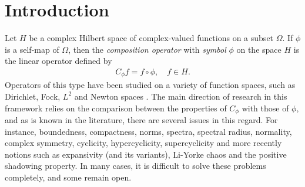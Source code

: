 \documentclass[11pt]{amsart}%
\numberwithin{equation}{section}
\theoremstyle{plain}
\theoremstyle{definition}
\theoremstyle{definition}
\begin{document}
\section{Introduction}
Let $H$ be a complex Hilbert space of complex-valued functions on a subset $\Omega.$  If $\phi$ is a self-map of $\Omega$, then the \textit{composition operator} with \textit{symbol} $\phi$ on the space $H$ is the linear operator defined by
\begin{align*}
C_{\phi}f=f\circ \phi,\quad f\in H.
\end{align*}
Operators of this type have been studied on a variety of function spaces, such as Dirichlet, Fock, $L^2$ and Newton spaces \cite{Bernardes-Darji,Cowen, Eva-Montes, Eva, Guo,Gordon}. The main direction of research in this framework relies on the comparison between the properties of $C_{\phi}$ with those of $\phi,$ and as is known in the literature, there are several issues in this regard. For instance, boundedness, compactness, norms, spectra, spectral radius, normality, complex symmetry, cyclicity, hypercyclicity, supercyclicity  and more recently notions such as expansivity (and its variants), Li-Yorke chaos and the positive shadowing property. In many cases, it is difficult to solve these problems completely, and some remain open.
\end{document}
